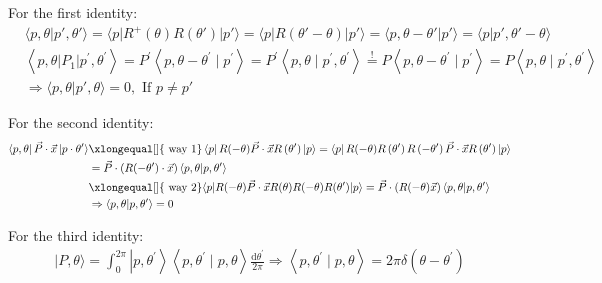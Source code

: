 \documentclass[]{ctexart}
\newcommand{\di}{\mathrm{d}}
\begin{document}
	\subsubsection{}
		For the first identity:
			\begin{equation*}
			\begin{aligned}
				&\langle p,\theta|p',\theta'\rangle=\langle p|R^+(\theta)R(\theta')|p'\rangle=\langle p |R(\theta'-\theta)|p'\rangle=\langle p,\theta-\theta'|p'\rangle=\langle p|p',\theta'-\theta\rangle\\
				&\left\langle p, \theta\left|P_{1}\right| p^{\prime}, \theta^{\prime}\right\rangle=P^{\prime}\left\langle p, \theta-\theta^{\prime} \mid p^{\prime}\right\rangle=P^{\prime}\left\langle p, \theta \mid p^{\prime}, \theta^{\prime}\right\rangle \stackrel{!}{=} P\left\langle p, \theta-\theta^{\prime} \mid p^{\prime}\right\rangle=P\left\langle p, \theta \mid p^{\prime}, \theta^{\prime}\right\rangle\\
				&\Rightarrow \langle p,\theta|p',\theta\rangle=0,\text{ If } p\neq p'
			\end{aligned}
			\end{equation*}
	
		For the second identity:
			\begin{equation*}
			\begin{aligned}
				\left\langle p, \theta\right|\vec{P} \cdot \vec{x}\left| p \cdot \theta^{\prime}\right\rangle &\xlongequal[]{\text { way } 1}\left\langle p\right|R(-\theta) \vec{P} \cdot \vec{x}R\left(\theta^{\prime}\right) \left| p\right\rangle=\left\langle p\right|R(-\theta) R\left(\theta^{\prime}\right) R\left(-\theta^{\prime}\right) \vec{P} \cdot \vec{x} R\left(\theta^{\prime}\right)\left| p\right\rangle\\
				&=\vec{P}\cdot\left(R(-\theta')\cdot \vec{x}\right)\langle p,\theta|p,\theta'\rangle\\
				&\xlongequal[]{\text { way } 2}\langle p | R(-\theta) \vec{P}\cdot \vec{x} R(\theta)R(-\theta)R(\theta')|p\rangle = \vec{P}\cdot \left(R(-\theta)\vec{x}\right)\langle p,\theta|p,\theta'\rangle\\
		   		&\Rightarrow \langle p,\theta|p,\theta'\rangle=0
			\end{aligned}
			\end{equation*}
			
		For the third identity:
			\begin{equation*}
			\begin{aligned}
				|P, \theta\rangle=\int_{0}^{2 \pi}\left|p, \theta^{\prime}\right\rangle\left\langle p, \theta^{\prime} \mid p, \theta\right\rangle \frac{\di \theta^{\prime}}{2 \pi} \Rightarrow\left\langle p, \theta^{\prime} \mid p, \theta\right\rangle=2 \pi \delta\left(\theta-\theta^{\prime}\right)
			\end{aligned}
			\end{equation*}
		
\end{document}

